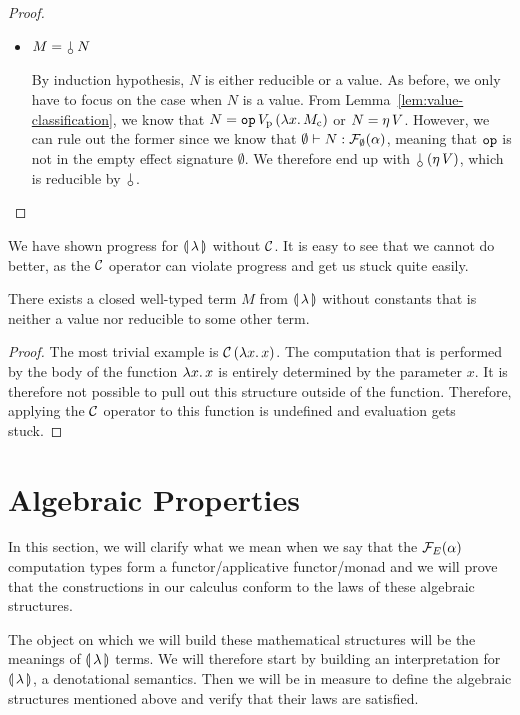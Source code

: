 \begin{proof}
\begin{itemize}
  \item $M = \ap{\cherry}{N}$

    By induction hypothesis, $N$ is either reducible or a value. As before,
    we only have to focus on the case when $N$ is a value. From
    Lemma~\ref{lem:value-classification}, we know that
    $N = \mathtt{op}\,V_{\mathrm{p}}\,(\lambda x.\, M_{\mathrm{c}})$ or $N =
    \eta\,V$. However, we can rule out the former since we know that
    $\emptyset \vdash N : \mathcal{F}_\emptyset(\alpha)$, meaning that $\mathtt{op}$ is
    not in the empty effect signature $\emptyset$. We therefore end up with
    $\ap{\cherry}{(\etaE{V})}$, which is reducible by $\cherry$.
  \end{itemize}
\end{proof}

We have shown progress for $\llparenthesis \, \lambda \, \rrparenthesis$ without $\mathcal{C}$. It is easy to
see that we cannot do better, as the $\mathcal{C}$ operator can violate progress
and get us stuck quite easily.

\begin{observation}
  There exists a closed well-typed term $M$ from $\llparenthesis \, \lambda \, \rrparenthesis$ without
  constants that is neither a value nor reducible to some other term.
\end{observation}

\begin{proof}
  The most trivial example is $\mathcal{C}\,(\lambda x.\, x)$. The computation
  that is performed by the body of the function $\lambda x.\, x$ is entirely
  determined by the parameter $x$. It is therefore not possible to pull out
  this structure outside of the function. Therefore, applying the $\mathcal{C}$
  operator to this function is undefined and evaluation gets stuck.
\end{proof}


\section{Algebraic Properties}
\label{sec:algebraic-properties}

In this section, we will clarify what we mean when we say that the
$\mathcal{F}_E(\alpha)$ computation types form a functor/applicative functor/monad
and we will prove that the constructions in our calculus conform to the
laws of these algebraic structures.

The object on which we will build these mathematical structures will be the
meanings of $\llparenthesis \, \lambda \, \rrparenthesis$ terms. We will therefore start by building
an interpretation for $\llparenthesis \, \lambda \, \rrparenthesis$, a denotational semantics. Then we
will be in measure to define the algebraic structures mentioned above and
verify that their laws are satisfied.


